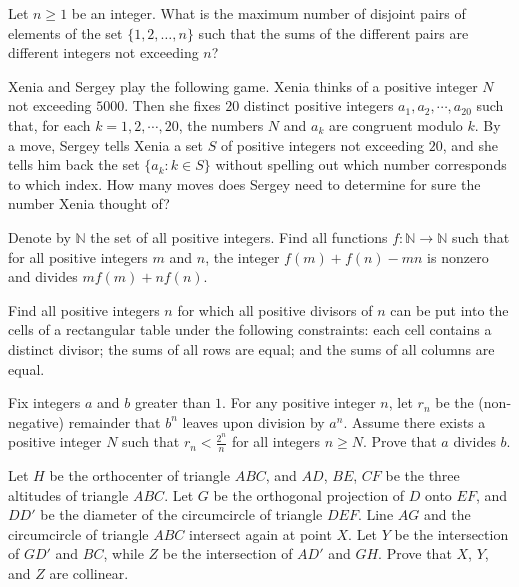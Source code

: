 \documentclass[11pt]{scrartcl}
\begin{document}
\begin{problem}[709204825099641]
Let $n \geq 1$ be an integer. What is the maximum number of disjoint pairs of elements of the set $\{ 1,2,\ldots , n \}$ such that the sums of the different pairs are different integers not exceeding $n$?
\end{problem}
\begin{problem}[894895504790373]
Xenia and Sergey play the following game. Xenia thinks of a positive integer $N$ not exceeding $5000$. Then she fixes $20$ distinct positive integers $a_1, a_2, \cdots, a_{20}$ such that, for each $k = 1,2,\cdots,20$, the numbers $N$ and $a_k$ are congruent modulo $k$. By a move, Sergey tells Xenia a set $S$ of positive integers not exceeding $20$, and she tells him back the set $\{a_k : k \in S\}$ without spelling out which number corresponds to which index. How many moves does Sergey need to determine for sure the number Xenia thought of?
\end{problem}
\begin{problem}[173979142158596]
Denote by $\mathbb{N}$ the set of all positive integers. Find all functions $f:\mathbb{N}\rightarrow \mathbb{N}$ such that for all positive integers $m$ and $n$, the integer $f(m)+f(n)-mn$ is nonzero and divides $mf(m)+nf(n)$.
\end{problem}
\begin{problem}[441177656992348]
	Find all positive integers $n$ for which all positive divisors of $n$ can be put into the cells of a rectangular table under the following constraints:
each cell contains a distinct divisor;
the sums of all rows are equal; and
the sums of all columns are equal.
\end{problem}
\begin{problem}[3812208515075577730]
Fix integers $a$ and $b$ greater than $1$. For any positive integer $n$, let $r_n$ be the (non-negative) remainder that $b^n$ leaves upon division by $a^n$. Assume there exists a positive integer $N$ such that $r_n < \frac{2^n}{n}$ for all integers $n\geq N$. Prove that $a$ divides $b$.
\end{problem}
\begin{problem}[1872712387771032593]
Let $H$ be the orthocenter of triangle $ABC$, and $AD$, $BE$, $CF$ be the three altitudes of triangle $ABC$. Let $G$ be the orthogonal projection of $D$ onto $EF$, and $DD'$ be the diameter of the circumcircle of triangle $DEF$. Line $AG$ and the circumcircle of triangle $ABC$ intersect again at point $X$. Let $Y$ be the intersection of $GD'$ and $BC$, while $Z$ be the intersection of $AD'$ and $GH$. Prove that $X$, $Y$, and $Z$ are collinear.
\end{problem}
\end{document}
